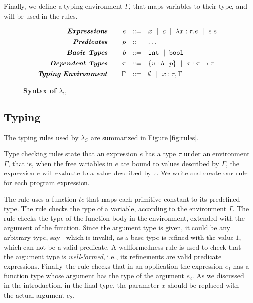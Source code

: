 Finally, we define a typing environment $\Gamma$, that maps variables to their type,
and will be used in the rules.


\begin{figure}[t!]
\centering
$$
\begin{array}{rrcl}
\emphbf{Expressions} \quad 
  & e 
  & ::= 
  &      x 
  \spmid c 
  \spmid \efunt{x}{\tau}{e} 
  \spmid \eapp{e}{e} 
  \\[0.05in] 

\emphbf{Predicates} \quad 
  & p
  & ::= 
  & \dots
  \\[0.05in] 

\emphbf{Basic Types} \quad 
  & b 
  & ::= 
  &      \tbint
  \spmid \tbbool
  \\[0.05in]

\emphbf{Dependent Types} \quad 
  & \tau 
  & ::= 
  &      \tref{b}{p} 
  \spmid \tfun{x}{\tau}{\tau}
  \\[0.05in]

\emphbf{Typing Environment} \quad 
  & \Gamma 
  & ::= 
  &      \emptyset 
  \spmid x:\tau, \Gamma

\end{array}
$$
\caption{\textbf{Syntax of $\lambda_C$}}
\label{fig:syntax}
\end{figure}



\subsection{Typing}
The typing rules used by $\lambda_C$ are summarized in Figure \ref{fig:rules}.

Type checking rules state that
an expression $e$ has a type $\tau$ under an environment $\Gamma$,
that is, when the free variables in $e$ are bound to values described by 
$\Gamma$, the expression $e$ will evaluate to a value described by $\tau$.
We write  and create one rule for each program expression.

The rule \tconst uses a function $tc$ that maps each primitive constant 
to its predefined type.
%
The rule \tvariable checks the type of a variable, according 
to the environment $\Gamma$.
%
The rule \tfunction checks the type of the function-body
in the environment, extended with the argument of the function.
Since the argument type is given, it could be any arbitrary type,
say ,
which is invalid, as a base type is refined with 
the value $1$, which can not be a valid predicate.
%
A wellformedness rule is used to 
check that the argument type is \textit{well-formed}, 
i.e., its refinements are valid predicate expressions.
%
Finally, the rule \tapp checks that in an application 
the expression $e_1$ has a function type
whose argument has the type of the argument $e_2$.
%
As we discussed in the introduction, in the final type,
the parameter $x$ should be replaced with the actual argument $e_2$.

